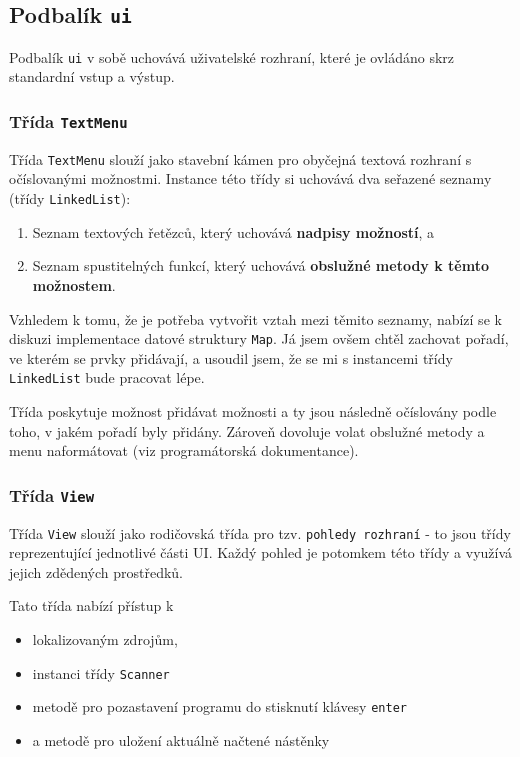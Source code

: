 \documentclass[FM,DP]{tulthesis}
\begin{document}
\subsection{Podbalík \texttt{ui}}
Podbalík \texttt{ui} v sobě uchovává uživatelské rozhraní, které je ovládáno skrz standardní vstup a výstup.

\subsubsection{Třída \texttt{TextMenu}}
Třída \texttt{TextMenu} slouží jako stavební kámen pro obyčejná textová rozhraní s očíslovanými možnostmi. Instance této třídy si uchovává dva seřazené seznamy (třídy \texttt{LinkedList}):

\begin{enumerate}
	\item Seznam textových řetězců, který uchovává \textbf{nadpisy možností}, a
	\item Seznam spustitelných funkcí, který uchovává \textbf{obslužné metody k těmto možnostem}.
\end{enumerate}

Vzhledem k tomu, že je potřeba vytvořit vztah mezi těmito seznamy, nabízí se k diskuzi implementace datové struktury \texttt{Map}. Já jsem ovšem chtěl zachovat pořadí, ve kterém se prvky přidávají, a usoudil jsem, že se mi s instancemi třídy \texttt{LinkedList} bude pracovat lépe.

Třída poskytuje možnost přidávat možnosti a ty jsou následně očíslovány podle toho, v jakém pořadí byly přidány. Zároveň dovoluje volat obslužné metody a menu naformátovat (viz programátorská dokumentance).

\subsubsection{Třída \texttt{View}}
Třída \texttt{View} slouží jako rodičovská třída pro tzv. \texttt{pohledy rozhraní} - to jsou třídy reprezentující jednotlivé části UI. Každý pohled je potomkem této třídy a využívá jejich zdědených prostředků.

Tato třída nabízí přístup k
\begin{itemize}
	\item lokalizovaným zdrojům,
	\item instanci třídy \texttt{Scanner}
	\item metodě pro pozastavení programu do stisknutí klávesy \texttt{enter}
	\item a metodě pro uložení aktuálně načtené nástěnky
\end{itemize}
\end{document}
